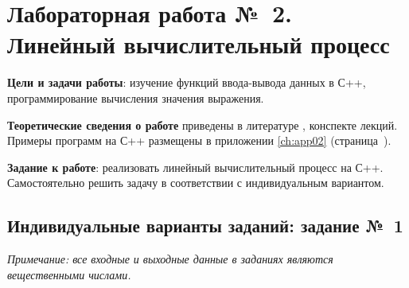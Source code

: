 \documentclass[main.tex]{subfiles}
\begin{document}
\chapter[Л/р~2 Линейный вычислительный процесс]{Лабораторная работа №~2. Линейный вычислительный процесс}

\textbf{Цели и задачи работы}: изучение функций ввода-вывода данных в С++, программирование вычисления значения выражения.

\textbf{Теоретические сведения о работе} приведены в литературе \cite{vs2010,qt2019}, конспекте лекций.
Примеры программ на С++ размещены в приложении \ref{ch:app02} (страница~\pageref{ch:app02}).

\textbf{Задание к работе}: реализовать линейный вычислительный процесс на С++.
Самостоятельно решить задачу в соответствии с индивидуальным вариантом.

\section{Индивидуальные варианты заданий: задание №~1}

\textit{Примечание: все входные и выходные данные в заданиях являются
вещественными числами.}
\\
\end{document}
